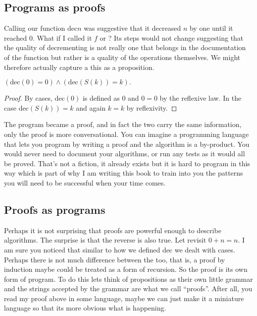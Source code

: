 \subsection{Programs as proofs}
Calling our function $\text{dec}{n}$ was suggestive that 
it decreased $n$ by one until it reached $0$.  What if I called 
it $f$ or ? Its steps would not change suggesting that 
the quality of decrementing is not really one that belongs in 
the documentation of the function but rather is a quality of the 
operations themselves.  We might therefore actually capture a 
this as a proposition.
\begin{proposition}
\(
    (\text{dec}(0)=0) \wedge (\text{dec}(S(k))=k).
\)
\end{proposition}
\begin{proof}
    By cases, $\text{dec}(0)$ is defined as $0$ and $0=0$ by 
    the reflexive law.  In the case $\text{dec}(S(k))=k$ 
    and again $k=k$ by reflexivity.
\end{proof}
The program became a proof, and in fact the two carry the 
same information, only the proof is more conversational.
You can imagine a programming language that lets you program 
by writing a proof and the algorithm is a by-product.  You would 
never need to document your algorithms, or run any tests as 
it would all be proved.  That's not a fiction, it already exists
but it is hard to program in this way which is part of why I am 
writing this book to train into you the patterns you will need 
to be successful when your time comes.


\subsection{Proofs as programs}
Perhaps it is not surprising that proofs are powerful enough to 
describe algorithms.  The surprise is that the reverse is also true.
Let revisit $0+n=n$.  I am sure you noticed that similar to how 
we defined $\text{dec}$ we dealt with cases.  
Perhaps there is not much difference between the too, that is, 
a proof by induction maybe could be treated as a form of recursion. So the 
proof is its own form of program.  To do this lets think of 
propositions as their own little grammar and the strings accepted 
by the grammar are what we call ``proofs''.   After all, you read 
my proof above in some language, maybe we can just make it a 
miniature language so that its more obvious what is happening. 

